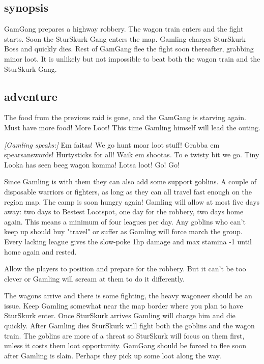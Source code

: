 \subsection*{synopsis}

GamGang prepares a highway robbery. The wagon train enters and the fight starts. Soon the SturSkurk Gang enters the map. Gamling charges SturSkurk Boss and quickly dies. Rest of GamGang flee the fight soon thereafter, grabbing minor loot. It is unlikely but not impossible to beat both the wagon train and the SturSkurk Gang.


\subsection*{adventure}

The food from the previous raid is gone, and the GamGang is starving again. Must have more food! More Loot! This time Gamling himself will lead the outing.

\begin{readoutloud}
\emph{[Gamling speaks:]}
Em faitas! We go hunt moar loot stuff! Grabba em spearsanswords! Hurtysticks for all! Waik em shootas. To e twisty bit we go. Tiny Looka has seen beeg wagon komma! Lotsa loot! Go! Go!
\end{readoutloud}

\noindent Since Gamling is with them they can also add some support goblins. A couple of disposable warriors or fighters, as long as they can all travel fast enough on the region map. The camp is soon hungry again! Gamling will allow at most five days away: two days to Bestest Lootspot, one day for the robbery, two days home again. This means a minimum of four leagues per day. Any goblins who can't keep up should buy "travel" or suffer as Gamling will force march the group. Every lacking league gives the slow-poke 1hp damage and max stamina -1 until home again and rested.

Allow the players to position and prepare for the robbery. But it can't be too clever or Gamling will scream at them to do it differently.

The wagons arrive and there is some fighting, the heavy wagoneer should be an issue. Keep Gamling somewhat near the map border where you plan to have SturSkurk enter. Once SturSkurk arrives Gamling will charge him and die quickly. After Gamling dies SturSkurk will fight both the goblins and the wagon train. The goblins are more of a threat so SturSkurk will focus on them first, unless it costs them loot opportunity.
GamGang should be forced to flee soon after Gamling is slain. Perhaps they pick up some loot along the way.


